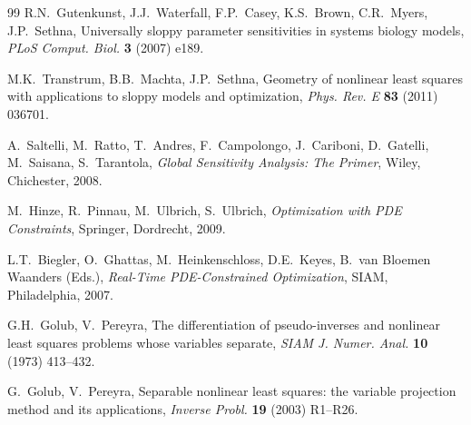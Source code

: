 \documentclass[preprint,12pt]{elsarticle}
\begin{document}
\begin{thebibliography}{99}
R.N.~Gutenkunst, J.J.~Waterfall, F.P.~Casey, K.S.~Brown, C.R.~Myers, J.P.~Sethna,
Universally sloppy parameter sensitivities in systems biology models,
\textit{PLoS Comput. Biol.} \textbf{3} (2007) e189.

M.K.~Transtrum, B.B.~Machta, J.P.~Sethna,
Geometry of nonlinear least squares with applications to sloppy models and optimization,
\textit{Phys. Rev. E} \textbf{83} (2011) 036701.

A.~Saltelli, M.~Ratto, T.~Andres, F.~Campolongo, J.~Cariboni, D.~Gatelli, M.~Saisana, S.~Tarantola,
\textit{Global Sensitivity Analysis: The Primer},
Wiley, Chichester, 2008.

M.~Hinze, R.~Pinnau, M.~Ulbrich, S.~Ulbrich,
\textit{Optimization with PDE Constraints},
Springer, Dordrecht, 2009.

L.T.~Biegler, O.~Ghattas, M.~Heinkenschloss, D.E.~Keyes, B.~van Bloemen Waanders (Eds.),
\textit{Real-Time PDE-Constrained Optimization},
SIAM, Philadelphia, 2007.

G.H.~Golub, V.~Pereyra,
The differentiation of pseudo-inverses and nonlinear least squares problems whose variables separate,
\textit{SIAM J. Numer. Anal.} \textbf{10} (1973) 413--432.

G.~Golub, V.~Pereyra,
Separable nonlinear least squares: the variable projection method and its applications,
\textit{Inverse Probl.} \textbf{19} (2003) R1--R26.

\end{thebibliography}
\end{document}
